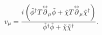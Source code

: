 \begin{equation}
v_\mu = { i\left(
\tilde \phi^\dagger T 
 \overset{\leftrightarrow}\partial_\mu\tilde \phi 
+\tilde \chi T 
 \overset{\leftrightarrow}\partial_\mu\tilde \chi^\dagger 
\right)  
\over 
\tilde \phi^\dagger \tilde \phi + 
\tilde \chi \tilde \chi^\dagger 
}.
\end{equation}

